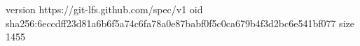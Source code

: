 version https://git-lfs.github.com/spec/v1
oid sha256:6eccdff23d81a6b6f5a74c6fa78a0e87babf0f5c0ca679b4f3d2bc6e541bf077
size 1455
